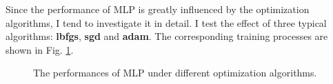 \documentclass[12pt,a4paper]{article}
\theoremstyle{definition}
\begin{document}
Since the performance of MLP is greatly influenced by the optimization algorithms, I tend to investigate it in detail. I test the effect of three typical algorithms: \textbf{lbfgs}, \textbf{sgd} and \textbf{adam}. The corresponding training processes are shown in Fig. \ref{fig:mlp-optimizer}.

\begin{figure}[H]
	\centering
	\caption{The performances of MLP under different optimization algorithms.}
	\label{fig:mlp-optimizer}
\end{figure}
\end{document}
